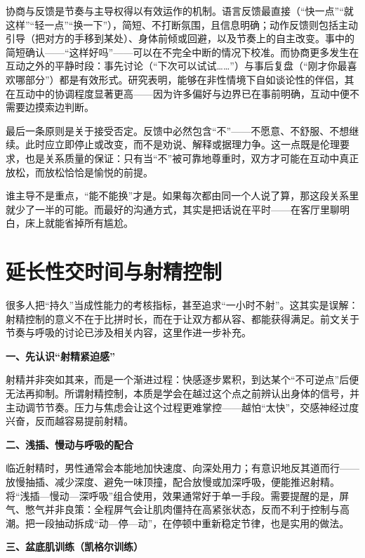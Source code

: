 \documentclass[12pt,UTF8]{ctexbook}
\begin{document}
协商与反馈是节奏与主导权得以有效运作的机制。语言反馈最直接（“快一点”“就这样”“轻一点”“换一下”），简短、不打断氛围，且信息明确；动作反馈则包括主动引导（把对方的手移到某处）、身体前倾或回避，以及节奏上的自主改变。事中的简短确认——“这样好吗”——可以在不完全中断的情况下校准。而协商更多发生在互动之外的平静时段：事先讨论（“下次可以试试……”）与事后复盘（“刚才你最喜欢哪部分”）都是有效形式。研究表明，能够在非性情境下自如谈论性的伴侣，其在互动中的协调程度显著更高——因为许多偏好与边界已在事前明确，互动中便不需要边摸索边判断。

最后一条原则是关于接受否定。反馈中必然包含“不”——不愿意、不舒服、不想继续。此时应立即停止或改变，而不是劝说、解释或据理力争。这一点既是伦理要求，也是关系质量的保证：只有当“不”被可靠地尊重时，双方才可能在互动中真正放松，而放松恰恰是愉悦的前提。

\begin{tcolorbox}[colback=pink!5!white,colframe=red!50!black,title=贴心小叮咛]
谁主导不是重点，“能不能换”才是。如果每次都由同一个人说了算，那这段关系里就少了一半的可能。而最好的沟通方式，其实是把话说在平时——在客厅里聊明白，床上就能省掉所有尴尬。
\end{tcolorbox}

\section{延长性交时间与射精控制}

很多人把“持久”当成性能力的考核指标，甚至追求“一小时不射”。这其实是误解：射精控制的意义不在于比拼时长，而在于让双方都从容、都能获得满足。前文关于节奏与呼吸的讨论已涉及相关内容，这里作进一步补充。

\textbf{一、先认识“射精紧迫感”}

射精并非突如其来，而是一个渐进过程：快感逐步累积，到达某个“不可逆点”后便无法再抑制。所谓射精控制，本质是学会在越过这个点之前辨认出身体的信号，并主动调节节奏。压力与焦虑会让这个过程更难掌控——越怕“太快”，交感神经过度兴奋，反而越容易提前射精。

\textbf{二、浅插、慢动与呼吸的配合}

临近射精时，男性通常会本能地加快速度、向深处用力；有意识地反其道而行——放慢抽插、减少深度、避免一味顶撞，配合放慢或加深呼吸，便能推迟射精。将“浅插—慢动—深呼吸”组合使用，效果通常好于单一手段。需要提醒的是，屏气、憋气并非良策：全程屏气会让肌肉僵持在高紧张状态，反而不利于控制与高潮。把一段抽动拆成“动—停—动”，在停顿中重新稳定节律，也是实用的做法。

\textbf{三、盆底肌训练（凯格尔训练）}
\end{document}

